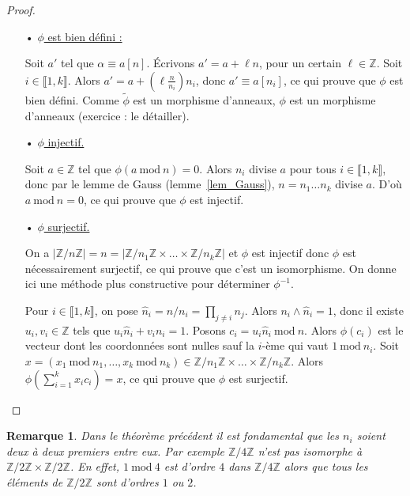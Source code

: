 \documentclass[12pt]{report}
\newtheorem{remarque}[thm]{Remarque}
\newcommand{\Z}{\mathbb{Z}}
\begin{document}
\begin{proof}\
\begin{itemize}
\item[•] \underline{$\phi$ est bien défini :}\par 
Soit $a'$ tel que $\alpha \equiv a [n]$. Écrivons $a'=a+\ell n$, pour un certain $\ell\in  \Z$. Soit $i\in \llbracket 1,k\rrbracket$. Alors $a'=a+(\ell\frac{n}{n_i})n_i$, donc $a'\equiv a [n_i]$, ce qui prouve que $\phi$ est bien défini. Comme $\tilde{\phi}$ est un morphisme d'anneaux, $\phi$ est un morphisme d'anneaux (exercice : le détailler).




\item[•] \underline{$\phi$ injectif.} \par 
Soit $a\in \Z$ tel que $\phi(a\mathrm{\ mod\ } n)=0$. Alors $n_i$ divise $a$ pour tous $i\in \llbracket 1,k\rrbracket$, donc par le lemme de Gauss (lemme~\ref{lem_Gauss}), $n=n_1\ldots n_k$ divise $a$. D'où $a\mathrm{\ mod\ }n=0$, ce qui prouve que $\phi$ est injectif.





\item[•] \underline{$\phi$ surjectif.} \par 

On a $|\Z/n\Z|=n=|\Z/n_1\Z\times \ldots \times \Z/n_k\Z|$ et $\phi$ est injectif donc $\phi$ est nécessairement surjectif, ce qui prouve que c'est un isomorphisme. On donne ici une méthode plus constructive pour déterminer $\phi^{-1}$.

Pour $i\in \llbracket 1,k\rrbracket$, on pose $\hat{n}_i=n/n_i=\prod_{j\neq i} n_j$. Alors $n_i\wedge \hat{n}_i=1$, donc il existe $u_i,v_i\in \Z$ tels que $u_i\hat{n}_i+v_in_i=1$. Posons $c_i=u_i\hat{n}_i\mathrm{\ mod \ }n$. Alors $\phi(c_i)$ est le vecteur dont les coordonnées sont nulles sauf la $i$-ème qui vaut $1\mathrm{\ mod\ }n_i$.  Soit $x=(x_1 \mathrm{\ mod\ }n_1,\ldots,x_k \mathrm{\ mod\ }n_k)\in \Z/n_1\Z\times \ldots\times \Z/n_k \Z$. Alors $\phi(\sum_{i=1}^k x_i c_i)=x$, ce qui prouve que $\phi$ est surjectif. 
 \end{itemize}
\end{proof}

\begin{remarque}
Dans le théorème précédent il est fondamental que les $n_i$ soient deux à deux premiers entre eux. Par exemple $\Z/4\Z$ n'est pas isomorphe à $\Z/2\Z\times \Z/2\Z$. En effet, $1\mathrm{\ mod\ }4$ est d'ordre $4$ dans $\Z/4\Z$ alors que tous les éléments de $\Z/2\Z$ sont d'ordres $1$ ou $2$. 
\end{remarque}
\end{document}
